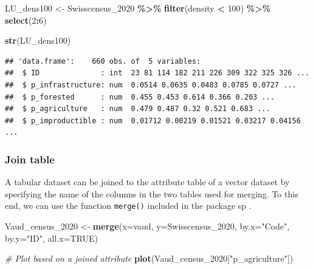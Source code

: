\documentclass[
]{article}
\newenvironment{Shaded}{\begin{snugshade}}{\end{snugshade}}
\newcommand{\AttributeTok}[1]{\textcolor[rgb]{0.13,0.29,0.53}{#1}}
\newcommand{\CommentTok}[1]{\textcolor[rgb]{0.56,0.35,0.01}{\textit{#1}}}
\newcommand{\ConstantTok}[1]{\textcolor[rgb]{0.56,0.35,0.01}{#1}}
\newcommand{\DecValTok}[1]{\textcolor[rgb]{0.00,0.00,0.81}{#1}}
\newcommand{\FunctionTok}[1]{\textcolor[rgb]{0.13,0.29,0.53}{\textbf{#1}}}
\newcommand{\NormalTok}[1]{#1}
\newcommand{\OtherTok}[1]{\textcolor[rgb]{0.56,0.35,0.01}{#1}}
\newcommand{\SpecialCharTok}[1]{\textcolor[rgb]{0.81,0.36,0.00}{\textbf{#1}}}
\newcommand{\StringTok}[1]{\textcolor[rgb]{0.31,0.60,0.02}{#1}}
\begin{document}
\begin{Shaded}
\begin{Highlighting}[]
\NormalTok{LU\_dens100 }\OtherTok{\textless{}{-}} 
\NormalTok{  Swisscensus\_2020 }\SpecialCharTok{\%\textgreater{}\%}
  \FunctionTok{filter}\NormalTok{(density }\SpecialCharTok{\textless{}} \DecValTok{100}\NormalTok{) }\SpecialCharTok{\%\textgreater{}\%}
  \FunctionTok{select}\NormalTok{(}\DecValTok{2}\SpecialCharTok{:}\DecValTok{6}\NormalTok{)}

\FunctionTok{str}\NormalTok{(LU\_dens100)}
\end{Highlighting}
\end{Shaded}

\begin{verbatim}
## 'data.frame':    660 obs. of  5 variables:
##  $ ID              : int  23 81 114 182 211 226 309 322 325 326 ...
##  $ p_infrastructure: num  0.0514 0.0635 0.0483 0.0785 0.0727 ...
##  $ p_forested      : num  0.455 0.453 0.614 0.366 0.203 ...
##  $ p_agriculture   : num  0.479 0.487 0.32 0.521 0.683 ...
##  $ p_improductible : num  0.01712 0.00219 0.01521 0.03217 0.04156 ...
\end{verbatim}

\subsubsection{Join table}\label{join-table}

A tabular dataset can be joined to the attribute table of a vector dataset by specifying the name of the columns in the two tables used for merging. To this end, we can use the function \texttt{merge()} included in the package sp .

\begin{Shaded}
\begin{Highlighting}[]
\NormalTok{Vaud\_census\_2020 }\OtherTok{\textless{}{-}} \FunctionTok{merge}\NormalTok{(}\AttributeTok{x=}\NormalTok{vaud, }\AttributeTok{y=}\NormalTok{Swisscensus\_2020,}
                             \AttributeTok{by.x=}\StringTok{"Code"}\NormalTok{, }
                             \AttributeTok{by.y=}\StringTok{"ID"}\NormalTok{,}
                             \AttributeTok{all.x=}\ConstantTok{TRUE}\NormalTok{)}

\CommentTok{\# Plot based on a joined attribute}
\FunctionTok{plot}\NormalTok{(Vaud\_census\_2020[}\StringTok{"p\_agriculture"}\NormalTok{])}
\end{Highlighting}
\end{Shaded}
\end{document}
